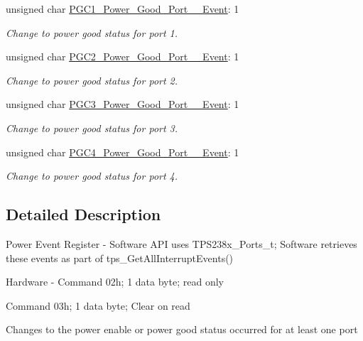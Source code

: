 \begin{DoxyCompactItemize}
unsigned char \hyperlink{struct_t_p_s238_x___power___enable___register__t_af6eb30a420cb334f7098a611a948fdef}{P\-G\-C1\-\_\-\-Power\-\_\-\-Good\-\_\-\-Port\-\_\-\_\-\-Event}\-: 1
\begin{DoxyCompactList}\small\item\em Change to power good status for port 1. \end{DoxyCompactList}\item 
unsigned char \hyperlink{struct_t_p_s238_x___power___enable___register__t_a017a37a7fb9a75c0f03a143cd650871e}{P\-G\-C2\-\_\-\-Power\-\_\-\-Good\-\_\-\-Port\-\_\-\_\-\-Event}\-: 1
\begin{DoxyCompactList}\small\item\em Change to power good status for port 2. \end{DoxyCompactList}\item 
unsigned char \hyperlink{struct_t_p_s238_x___power___enable___register__t_a2391ef3673f7408e577f7dc93ebf4002}{P\-G\-C3\-\_\-\-Power\-\_\-\-Good\-\_\-\-Port\-\_\-\_\-\-Event}\-: 1
\begin{DoxyCompactList}\small\item\em Change to power good status for port 3. \end{DoxyCompactList}\item 
unsigned char \hyperlink{struct_t_p_s238_x___power___enable___register__t_abd6d5d7b0657dd074bac96118960234c}{P\-G\-C4\-\_\-\-Power\-\_\-\-Good\-\_\-\-Port\-\_\-\_\-\-Event}\-: 1
\begin{DoxyCompactList}\small\item\em Change to power good status for port 4. \end{DoxyCompactList}\end{DoxyCompactItemize}


\subsection{Detailed Description}
Power Event Register -\/ Software A\-P\-I uses T\-P\-S238x\-\_\-\-Ports\-\_\-t; Software retrieves these events as part of tps\-\_\-\-Get\-All\-Interrupt\-Events() \par
 Hardware -\/ Command 02h; 1 data byte; read only \par

\begin{DoxyItemize}
\item Command 03h; 1 data byte; Clear on read \par
\par
 Changes to the power enable or power good status occurred for at least one port 
\end{DoxyItemize}

